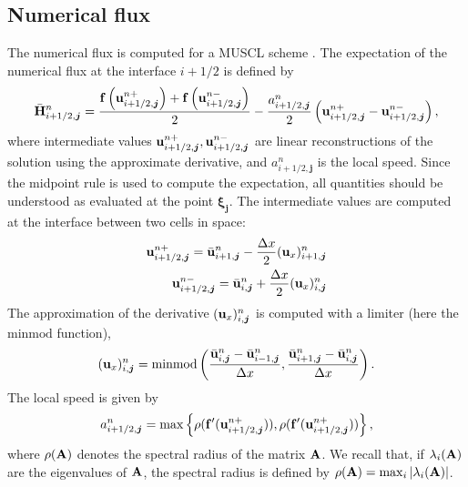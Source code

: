 \documentclass{article}
\newcommand{\bfA}{ {\bf A} }
\newcommand{\bfu}{ {\bf u} }
\newcommand{\bfx}{ {\bf x} }
\newcommand{\bfj}{ {\bf j} }
\newcommand{\ibfj}{ {\boldsymbol{j}  } }
\newcommand{\bfxi}{ {\bm \xi} }
\newcommand{\bff}{ {\bf f} }
\newcommand{\bfH}{ {\bf H} }
\newcommand{\minmod}{ \text{minmod} }
\begin{document}
\subsection{Numerical flux}
The numerical flux is computed for a MUSCL scheme \cite{kurganov_new_2000}.
The expectation of the numerical flux at the interface $i+1/2$ is defined by
\begin{equation}
\bar{\bfH}_{i+1/2,\ibfj}^n  = 
\frac{ \bff \left( \bfu_{i+1/2,\ibfj}^{n +} \right) 
     + \bff \left( \bfu_{i+1/2,\ibfj}^{n -} \right) }{2}
- \frac{a_{i+1/2,\ibfj}^n}{2} \left( \bfu_{i+1/2,\ibfj}^{n +}  - \bfu_{i+1/2,\ibfj}^{n -}  \right),
\end{equation}
where intermediate values $\bfu_{i+1/2,\ibfj}^{n +}, \bfu_{i+1/2,\ibfj}^{n -}$ are linear reconstructions of the solution using the approximate derivative,
and $a_{i+1/2,\ibfj}^n$ is the local speed. 
Since the midpoint rule is used to compute the expectation, all quantities should be understood as evaluated at the point $\bfxi_\ibfj$. 
The intermediate values are computed at the interface between two cells in space: 
\begin{align} \label{eq:SFV_interpolation}
    \bfu_{i+1/2,\ibfj}^{n +} = \bar \bfu_{i+1,\ibfj}^n  - \frac{\Delta x}{2} (\bfu_x)_{i+1,\ibfj}^n  
    \\
    \bfu_{i+1/2,\ibfj}^{n -} = \bar \bfu_{i,\ibfj}^n  + \frac{\Delta x}{2} (\bfu_x)_{i,\ibfj}^n  
\end{align}
The approximation of the derivative $ (\bfu_x)_{i,\ibfj}^n $ is computed with a limiter (here the $\minmod$ function), 
\begin{equation}
    (\bfu_x)_{i,\ibfj}^n  = \minmod \left(
        \frac{\bar{\bfu}_{i,\ibfj}^n - \bar{\bfu}_{i-1,\ibfj}^n }{\Delta x}, \frac{\bar{\bfu}_{i+1,\ibfj}^n - \bar{\bfu}_{i,\ibfj}^n }{\Delta x}
    \right). 
\end{equation}
The local speed is given by 
\begin{equation}
    a_{i+1/2,\ibfj}^n  = \max\left\{
        \rho(\bff'(\bfu_{i+1/2,\ibfj}^{n +})), \rho(\bff'(\bfu_{i+1/2,\ibfj}^{n +}))
    \right\},
\end{equation}
where $\rho(\bfA)$ denotes the spectral radius of the matrix $\bfA$. 
We recall that, if $\lambda_i(\bfA)$ are the eigenvalues of  $\bfA$, the spectral radius is defined by
$\rho(\bfA) = \max_i |\lambda_i(\bfA)|$. 
\end{document}
